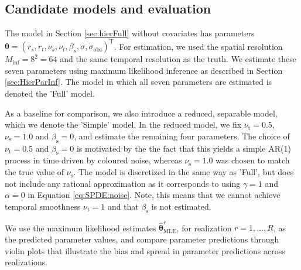 \documentclass[12pt]{article} %
\begin{document}
\subsection{Candidate models and evaluation}
The model in Section \ref{sec:hierFull} without covariates has parameters $\boldsymbol{\theta}=(r_s, r_t, \nu_s, \nu_t, \beta_s, \sigma, \sigma_\mathrm{obs})^\mathrm{T}$. For estimation, we used the spatial resolution $M_{\mathrm{inf}} = 8^2 = 64$ and the same temporal resolution as the truth. We estimate these seven parameters using maximum likelihood inference as described in Section \ref{sec:HierParInf}. The model in which all seven parameters are estimated is denoted the 'Full' model.

As a baseline for comparison, we also introduce a reduced, separable model, which we denote the 'Simple' model. In the reduced model, we fix $\nu_\mathrm{t}=0.5$, $\nu_\mathrm{s}=1.0$ and $\beta_\mathrm{s}=0$, and estimate the remaining four parameters. The choice of $\nu_\mathrm{t}=0.5$ and $\beta_\mathrm{s}=0$ is motivated by the the fact that this yields a simple AR(1) process in time driven by coloured noise, whereas $\nu_\mathrm{s}=1.0$ was chosen to match the true value of $\nu_\mathrm{s}$. The model is discretized in the same way as 'Full', but does not include any rational approximation as it corresponds to using $\gamma = 1$ and $\alpha = 0$ in Equation \eqref{eq:SPDE:noise}. Note, this means that we cannot achieve temporal smoothness $\nu_\mathrm{t} = 1$ and that $\beta_\mathrm{s}$ is not estimated.

We use the maximum likelihood estimates $\hat{\boldsymbol{\theta}}_{\mathrm{MLE}}^r$, for realization $r=1,\ldots,R$, as the predicted parameter values, and compare parameter predictions through violin plots that illustrate the bias and spread in parameter predictions across realizations.
\end{document}
